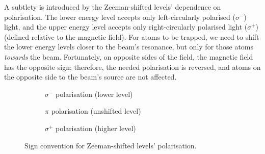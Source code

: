 \documentclass[11pt,twoside,a4paper]{article}
\begin{document}
A subtlety is introduced by the Zeeman-shifted levels' dependence on polarisation. The lower energy level accepts only left-circularly polarised (\(\sigma^-\)) light, and the upper energy level accepts only right-circularly polarised light (\(\sigma^+\)) (defined relative to the magnetic field). For atoms to be trapped, we need to shift the lower energy
levels closer to the beam's resonance, but only for those atoms \textit{towards} the beam. Fortunately, on opposite sides of the field, the magnetic field has the opposite sign; therefore, the needed polarisation is reversed, and atoms on the opposite side to the beam's source are not affected.~\cite{umkc}
\begin{figure}[h]
    \centering
    \begin{subfigure}{.3\textwidth}
        \centering
        \caption{\(\sigma^-\) polarisation (lower level)}
    \end{subfigure}
    \begin{subfigure}{.3\textwidth}
        \centering
        \caption{\(\pi\) polarisation (unshifted level)}
    \end{subfigure}
    \begin{subfigure}{.3\textwidth}
        \centering
        \caption{\(\sigma^+\) polarisation (higher level)}
    \end{subfigure}

    \caption{Sign convention for Zeeman-shifted levels' polarisation.}
\end{figure}
\vfill
\pagebreak
\end{document}
